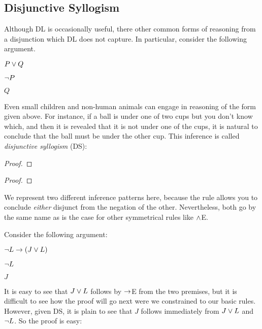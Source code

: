 \subsection{Disjunctive Syllogism}
  \label{DS}

Although DL is occasionally useful, there other common forms of reasoning from a disjunction which DL does not capture.
In particular, consider the following argument.

\begin{earg}
\item[] $P \vee Q$
\item[] $\neg P$
\item[\therefore] $Q$
\end{earg}

Even small children and non-human animals can engage in reasoning of the form given above.
For instance, if a ball is under one of two cups but you don't know which, and then it is revealed that it is not under one of the cups, it is natural to conclude that the ball must be under the other cup.
This inference is called \textit{disjunctive syllogism} (DS):

\begin{multicols}{2}

\begin{proof}
	\metaA{} 
\end{proof}

\begin{proof}
	\metaB{} 
\end{proof}

\end{multicols}

We represent two different inference patterns here, because the rule allows you to conclude \emph{either} disjunct from the negation of the other.
Nevertheless, both go by the same name as is the case for other symmetrical rules like $\wedge$E.

Consider the following argument:

\begin{earg}
\item[] $\neg L \rightarrow (J \vee L)$
\item[] $\neg L$
\item[\therefore] $J$
\end{earg}

It is easy to see that $J\vee L$ follows by $\rightarrow$E from the two premises, but it is difficult to see how the proof will go next were we constrained to our basic rules.
However, given DS, it is plain to see that $J$ follows immediately from $J\vee L$ and $\neg L$. 
So the proof is easy:


